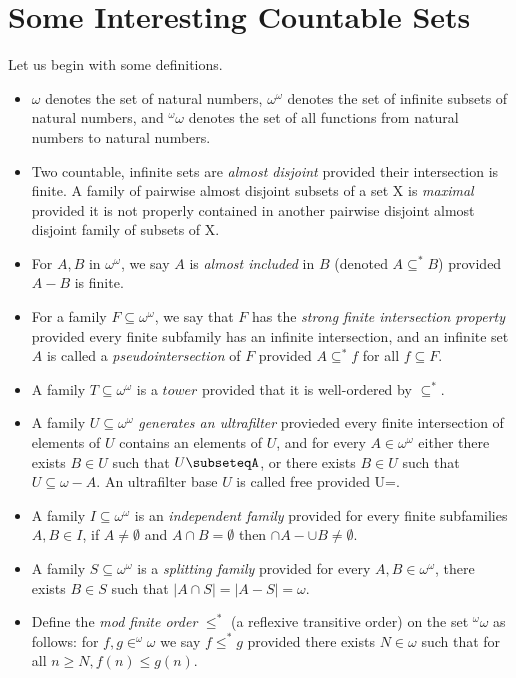 \documentclass[12pt]{article}
\theoremstyle{definition}
\begin{document}
\section{Some Interesting Countable Sets}
Let us begin with some definitions.
\begin{itemize}
    \item $\omega$ denotes the set of natural numbers, $\omega^\omega$ denotes the set of infinite subsets of natural numbers, and $^\omega\omega$ denotes the set of all functions from natural numbers to natural numbers.
    \item Two countable, infinite sets are \textit{almost disjoint} provided their intersection is finite. A family of pairwise almost disjoint subsets of a set X is \textit{maximal} provided it is not properly contained in another pairwise disjoint almost disjoint family of subsets of X.
    \item For $A, B$ in $\omega^\omega$, we say $A$ is \textit{almost included} in $B$ (denoted $A\subseteq^*B$) provided $A-B$ is finite.
    \item For a family $F\subseteq\omega^\omega$, we say that $F$ has the \textit{strong finite intersection property} provided every finite subfamily has an infinite intersection, and an infinite set $A$ is called a \textit{pseudointersection} of $F$ provided $A\subseteq^*f$ for all $f\subseteq F$.
    \item A family $T\subseteq\omega^\omega$ is a $tower$ provided that it is well-ordered by $\subseteq^*$.
    \item A family $U\subseteq\omega^\omega$ \textit{generates an ultrafilter} provieded every finite intersection of elements of $U$ contains an elements of $U$, and for every $A\in\omega^\omega$ either there exists $B\in U$ such that $U\subseteqA$, or there exists $B\in U$ such that $U\subseteq\omega-A$. An ultrafilter base $U$ is called free provided \cap U=\emptyset.
    \item A family $I\subseteq\omega^\omega$ is an \textit{independent family} provided for every finite subfamilies $A, B\in I$, if $A\neq\emptyset$ and $A\cap B=\emptyset$ then $\cap A-\cup B\neq\emptyset$.
    \item A family $S\subseteq\omega^\omega$ is a \textit{splitting family} provided for every $A, B\in\omega^\omega$, there exists $B\in S$ such that $|A\cap S|=|A-S|=\omega$.
    \item Define the \textit{mod finite order} $\leq^*$ (a reflexive transitive order) on the set $^\omega\omega$ as follows: for $f,g\in ^\omega\omega$ we say $f\leq^*g$ provided there exists $N\in \omega$ such that for all $n\geq N, f(n)\leq g(n)$.

\end{itemize}
\end{document}
